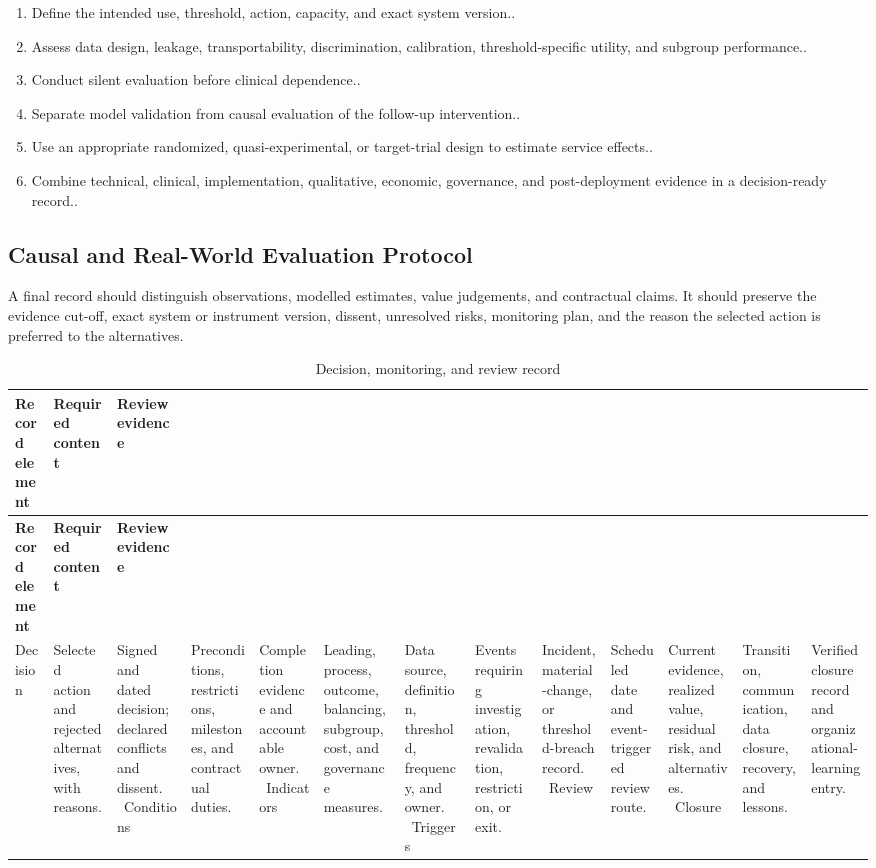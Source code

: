 \begin{enumerate}
 \item Define the intended use, threshold, action, capacity, and exact system version..
 \item Assess data design, leakage, transportability, discrimination, calibration, threshold-specific utility, and subgroup performance..
 \item Conduct silent evaluation before clinical dependence..
 \item Separate model validation from causal evaluation of the follow-up intervention..
 \item Use an appropriate randomized, quasi-experimental, or target-trial design to estimate service effects..
 \item Combine technical, clinical, implementation, qualitative, economic, governance, and post-deployment evidence in a decision-ready record..
\end{enumerate}

\subsection{Causal and Real-World Evaluation Protocol}
\label{sec:comp-ch11-supp-3}
A final record should distinguish observations, modelled estimates, value
judgements, and contractual claims. It should preserve the evidence cut-off, exact
system or instrument version, dissent, unresolved risks, monitoring plan, and the
reason the selected action is preferred to the alternatives.

\begin{longtable}{@{}p{}p{}p{}@{}}
\caption{Decision, monitoring, and review record}
\label{tab:comp-ch11-decision-record}\\
\toprule
\textbf{Record element} & \textbf{Required content} & \textbf{Review evidence} \\
\midrule
\endfirsthead
\toprule
\textbf{Record element} & \textbf{Required content} & \textbf{Review evidence} \\
\midrule
\endhead
\bottomrule
\endlastfoot
Decision & Selected action and rejected alternatives, with reasons. & Signed and dated decision; declared conflicts and dissent. \
Conditions & Preconditions, restrictions, milestones, and contractual duties. & Completion evidence and accountable owner. \
Indicators & Leading, process, outcome, balancing, subgroup, cost, and governance measures. & Data source, definition, threshold, frequency, and owner. \
Triggers & Events requiring investigation, revalidation, restriction, or exit. & Incident, material-change, or threshold-breach record. \
Review & Scheduled date and event-triggered review route. & Current evidence, realized value, residual risk, and alternatives. \
Closure & Transition, communication, data closure, recovery, and lessons. & Verified closure record and organizational-learning entry. \
\end{longtable}

